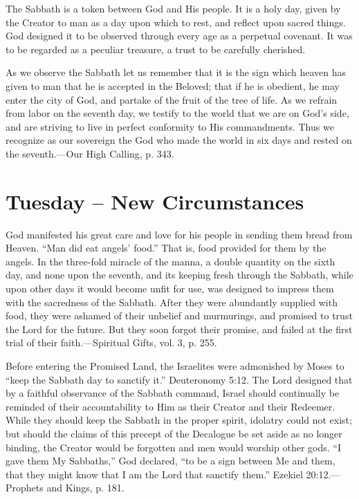 \documentclass[a4paper, 10pt, twoside, headings=small]{scrartcl}
\begin{document}
\begin{multicols}{2}
The Sabbath is a token between God and His people. It is a holy day, given by the Creator to man as a day upon which to rest, and reflect upon sacred things. God designed it to be observed through every age as a perpetual covenant. It was to be regarded as a peculiar treasure, a trust to be carefully cherished.

As we observe the Sabbath let us remember that it is the sign which heaven has given to man that he is accepted in the Beloved; that if he is obedient, he may enter the city of God, and partake of the fruit of the tree of life. As we refrain from labor on the seventh day, we testify to the world that we are on God’s side, and are striving to live in perfect conformity to His commandments. Thus we recognize as our sovereign the God who made the world in six days and rested on the seventh.—Our High Calling, p. 343.

\section*{Tuesday – New Circumstances}

God manifested his great care and love for his people in sending them bread from Heaven. “Man did eat angels’ food.” That is, food provided for them by the angels. In the three-fold miracle of the manna, a double quantity on the sixth day, and none upon the seventh, and its keeping fresh through the Sabbath, while upon other days it would become unfit for use, was designed to impress them with the sacredness of the Sabbath. After they were abundantly supplied with food, they were ashamed of their unbelief and murmurings, and promised to trust the Lord for the future. But they soon forgot their promise, and failed at the first trial of their faith.—Spiritual Gifts, vol. 3, p. 255.

Before entering the Promised Land, the Israelites were admonished by Moses to “keep the Sabbath day to sanctify it.” Deuteronomy 5:12. The Lord designed that by a faithful observance of the Sabbath command, Israel should continually be reminded of their accountability to Him as their Creator and their Redeemer. While they should keep the Sabbath in the proper spirit, idolatry could not exist; but should the claims of this precept of the Decalogue be set aside as no longer binding, the Creator would be forgotten and men would worship other gods. “I gave them My Sabbaths,” God declared, “to be a sign between Me and them, that they might know that I am the Lord that sanctify them.” Ezekiel 20:12.—Prophets and Kings, p. 181.


\end{multicols}
\end{document}
